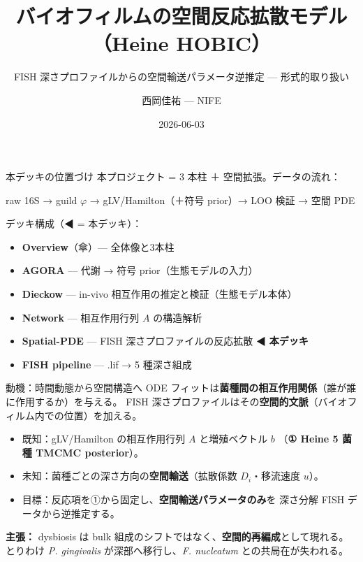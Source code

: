 \documentclass[
  ignorenonframetext,
  aspectratio=169,
]{beamer}
\title{バイオフィルムの空間反応拡散モデル（Heine HOBIC）}
\subtitle{FISH 深さプロファイルからの空間輸送パラメータ逆推定 ---
形式的取り扱い}
\author{西岡佳祐 --- NIFE}
\date{2026-06-03}
\providecommand{\tightlist}{%
  \setlength{\itemsep}{0pt}\setlength{\parskip}{0pt}}
\begin{document}
\frame{\titlepage}

\begin{frame}{本デッキの位置づけ}
\protect\hypertarget{ux672cux30c7ux30c3ux30adux306eux4f4dux7f6eux3065ux3051}{}
本プロジェクト = 3 本柱 ＋ 空間拡張。データの流れ：

raw 16S → guild \(\varphi\) → gLV/Hamilton（＋符号 prior）→ LOO 検証 →
空間 PDE

デッキ構成（◀ = 本デッキ）：

\begin{itemize}
\tightlist
\item
  \textbf{Overview}（傘）--- 全体像と3本柱
\item
  \textbf{AGORA} --- 代謝 → 符号 prior（生態モデルの入力）
\item
  \textbf{Dieckow} --- in-vivo 相互作用の推定と検証（生態モデル本体）
\item
  \textbf{Network} --- 相互作用行列 \(A\) の構造解析
\item
  \textbf{Spatial-PDE} --- FISH 深さプロファイルの反応拡散 ◀
  \textbf{本デッキ}
\item
  \textbf{FISH pipeline} --- .lif → 5 種深さ組成
\end{itemize}
\end{frame}

\begin{frame}{動機：時間動態から空間構造へ}
\protect\hypertarget{ux52d5ux6a5fux6642ux9593ux52d5ux614bux304bux3089ux7a7aux9593ux69cbux9020ux3078}{}
ODE
フィットは\textbf{菌種間の相互作用関係}（誰が誰に作用するか）を与える。
FISH
深さプロファイルはその\textbf{空間的文脈}（バイオフィルム内での位置）を加える。

\begin{itemize}
\tightlist
\item
  既知：gLV/Hamilton の相互作用行列 \(A\) と増殖ベクトル \(b\)
  （\textbf{① Heine 5 菌種 TMCMC posterior}）。
\item
  未知：菌種ごとの深さ方向の\textbf{空間輸送}（拡散係数
  \(D_i\)・移流速度 \(u\)）。
\item
  目標：反応項を①から固定し、\textbf{空間輸送パラメータのみ}を 深さ分解
  FISH データから逆推定する。
\end{itemize}

\vspace{0.4em}

\textbf{主張：} dysbiosis は bulk
組成のシフトではなく、\textbf{空間的再編成}として現れる。 とりわけ
\emph{P. gingivalis} が深部へ移行し、\emph{F. nucleatum}
との共局在が失われる。
\end{frame}
\end{document}
